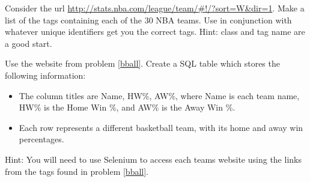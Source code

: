 \begin{problem}\label{bball}
Consider the url \url{http://stats.nba.com/league/team/#!/?sort=W&dir=1}.
Make a list of the  tags containing each of the 30 NBA teams.
Use  in conjunction with whatever unique identifiers get you the correct tags.
Hint: class and tag name are a good start.
\end{problem}

\begin{problem}
Use the website from problem \ref{bball}.
Create a SQL table which stores the following information:
\begin{itemize}
\item The column titles are Name, HW\%, AW\%, where Name is each team name, HW\% is the Home Win \%, and AW\% is the Away Win \%.
\item Each row represents a different basketball team, with its home and away win percentages.
\end{itemize}
Hint: You will need to use Selenium to access each teams website using the links from the tags found in problem \ref{bball}.
\end{problem}